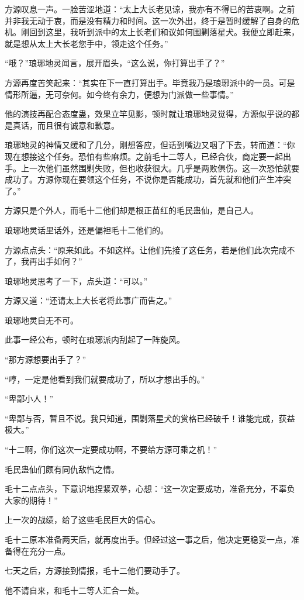 \begin{this_body}
方源叹息一声。一脸苦涩地道：“太上大长老见谅，我亦有不得已的苦衷啊。之前并非我无动于衷，而是没有精力和时间。这一次外出，终于是暂时缓解了自身的危机。刚回到这里，我听到派中的太上长老们和议如何围剿落星犬。我便立即赶来，就是想从太上大长老您手中，领走这个任务。”

“哦？”琅琊地灵闻言，展开眉头，“这么说，你打算出手了？”

方源再度苦笑起来：“其实在下一直打算出手。毕竟我乃是琅琊派中的一员。可是情形所逼，无可奈何。如今终有余力，便想为门派做一些事情。”

他的演技再配合态度蛊，效果立竿见影，顿时就让琅琊地灵觉得，方源似乎说的都是真话，而且很有诚意和歉意。

琅琊地灵的神情又缓和了几分，刚想答应，但话到嘴边又咽了下去，转而道：“你现在想接这个任务。恐怕有些麻烦。之前毛十二等人，已经合伙，商定要一起出手。上一次他们虽然围剿失败，但也收获很大。几乎是两败俱伤。这一次恐怕就要成功了。方源你现在要领这个任务，不说你是否能成功，首先就和他们产生冲突了。”

方源只是个外人，而毛十二他们却是根正苗红的毛民蛊仙，是自己人。

琅琊地灵话里话外，还是偏袒毛十二他们的。

方源点点头：“原来如此。不如这样。让他们先接了这任务，若是他们此次完成不了，我再出手如何？”

琅琊地灵思考了一下，点头道：“可以。”

方源又道：“还请太上大长老将此事广而告之。”

琅琊地灵自无不可。

此事一经公布，顿时在琅琊派内刮起了一阵旋风。

“那方源想要出手了？”

“哼，一定是他看到我们就要成功了，所以才想出手的。”

“卑鄙小人！”

“卑鄙与否，暂且不说。我只知道，围剿落星犬的赏格已经破千！谁能完成，获益极大。”

“十二啊，你们这次一定要成功啊，不要给方源可乘之机！”

毛民蛊仙们颇有同仇敌忾之情。

毛十二点点头，下意识地捏紧双拳，心想：“这一次定要成功，准备充分，不辜负大家的期待！”

上一次的战绩，给了这些毛民巨大的信心。

毛十二原本准备两天后，就再度出手。但经过这一事之后，他决定更稳妥一点，准备得在充分一点。

七天之后，方源接到情报，毛十二他们要动手了。

他不请自来，和毛十二等人汇合一处。


\end{this_body}

